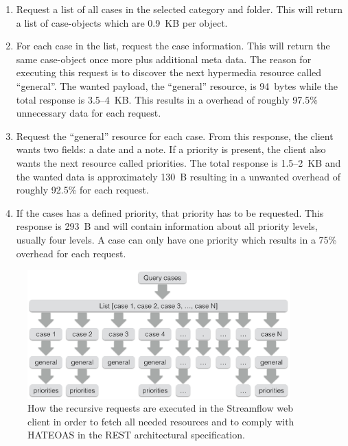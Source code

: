 \documentclass{cslthse-msc}
\begin{document}
\begin{enumerate}
	\item Request a list of all cases in the selected category and folder. This will return a list of case-objects which are 0.9~KB per object.
	\item For each case in the list, request the case information. This will return the same case-object once more plus additional meta data. The reason for executing this request is to discover the next hypermedia resource called \enquote{general}. The wanted payload, the \enquote{general} resource, is 94~bytes while the total response is 3.5--4~KB. This results in a overhead of roughly 97.5\% unnecessary data for each request.
	\item Request the \enquote{general} resource for each case. From this response, the client wants two fields: a date and a note. If a priority is present, the client also wants the next resource called priorities. The total response is 1.5--2~KB and the wanted data is approximately 130~B resulting in a unwanted overhead of roughly 92.5\% for each request.
	\item If the cases has a defined priority, that priority has to be requested. This response is 293~B and will contain information about all priority levels, usually four levels. A case can only have one priority which results in a 75\% overhead for each request.
\end{enumerate}

\begin{figure}[H]
  \centering
    \begin{center}
      \includegraphics[width=0.9\textwidth]{images/streamflow_cases.png}
    \end{center}
  \caption{How the recursive requests are executed in the Streamflow web client in order to fetch all needed resources and to comply with HATEOAS in the REST architectural specification.}
\end{figure}
\end{document}
